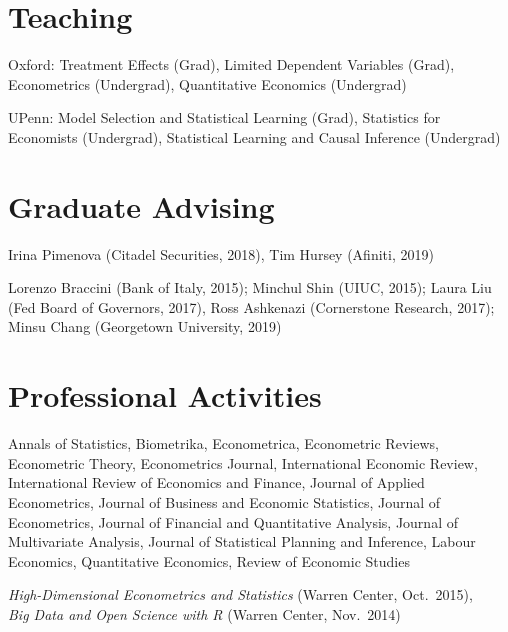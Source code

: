 \documentclass[line,overlapped]{myres}
\begin{document}
\begin{resume}
\section{\sc Teaching }
\vspace{0.5em}
  Oxford: Treatment Effects (Grad), Limited Dependent Variables (Grad), Econometrics (Undergrad), Quantitative Economics (Undergrad)

	UPenn: Model Selection and Statistical Learning (Grad), Statistics for Economists (Undergrad), Statistical Learning and Causal Inference (Undergrad)
	


\section{\sc Graduate Advising}
\begin{description}[style=multiline,leftmargin=3cm,font=\normalfont]
  \item[Main Supervisor:] Irina Pimenova (Citadel Securities, 2018), Tim Hursey (Afiniti, 2019)
  \item[Committee \\ Member:] Lorenzo Braccini (Bank of Italy, 2015); Minchul Shin (UIUC, 2015); Laura Liu (Fed Board of Governors, 2017), Ross Ashkenazi (Cornerstone Research, 2017); Minsu Chang (Georgetown University, 2019)
\end{description}


\section{\sc Professional Activities}

\begin{description}[style=multiline,leftmargin=3cm,font=\normalfont]
  \item[Refereeing:] Annals of Statistics, Biometrika, Econometrica, Econometric Reviews, Econometric Theory, Econometrics Journal, International Economic Review, International Review of Economics and Finance, Journal of Applied Econometrics, Journal of Business and Economic Statistics, Journal of Econometrics, Journal of Financial and Quantitative Analysis, Journal of Multivariate Analysis, Journal of Statistical Planning and Inference, Labour Economics, Quantitative Economics, Review of Economic Studies 
  \item[Workshops \\ Organized:]
    \emph{High-Dimensional Econometrics and Statistics} (Warren Center, Oct.\ 2015), \\
    \emph{Big Data and Open Science with R} (Warren Center, Nov.\ 2014)
\end{description}




\end{resume}
\end{document}
